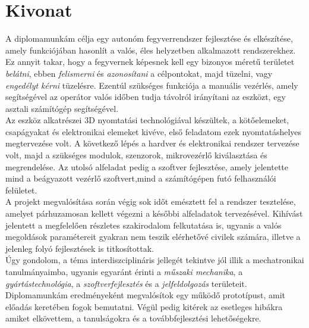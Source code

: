 \setcounter{page}{1}

\selecthungarian

\chapter*{Kivonat}

A diplomamunkám célja egy autonóm fegyverrendszer fejlesztése és elkészítése, amely funkciójában hasonlít a valós, éles helyzetben alkalmazott rendszerekhez. Ez annyit takar, hogy a fegyvernek képesnek kell egy bizonyos méretű területet \textsl{belátni}, ebben \textsl{felismerni} és \textsl{azonosítani} a célpontokat, majd tüzelni, vagy \textsl{engedélyt kérni} tüzelésre. Ezentúl szükséges funkciója a manuális vezérlés, amely segítségével az operátor valós időben tudja távolról irányítani az eszközt, egy asztali számítógép segítségével.\\

Az eszköz alkatrészei 3D nyomtatási technológiával készültek, a kötőelemeket, csapágyakat és elektronikai elemeket kivéve, első feladatom ezek nyomtatáshelyes megtervezése volt. A következő lépés a hardver és elektronikai rendszer tervezése volt, majd a szükséges modulok, szenzorok, mikrovezérlő kiválasztása és megrendelése. Az utolsó alfeladat pedig a szoftver fejlesztése, amely jelentette mind a beágyazott vezérlő szoftvert,mind a számítógépen futó felhasználói felületet.\\

A projekt megvalósítása során végig sok időt emésztett fel a rendszer tesztelése, amelyet párhuzamosan kellett végezni a későbbi alfeladatok tervezésével. Kihívást jelentett a megfelelően részletes szakirodalom felkutatása is, ugyanis a valós megoldások paramétereit gyakran nem teszik elérhetővé civilek számára, illetve a jelenleg folyó fejlesztések is titkosítottak.\\

Úgy gondolom, a téma interdiszciplináris jellegét tekintve jól illik a mechatronikai tanulmányaimba, ugyanis egyaránt érinti a \textsl{műszaki mechanika},  a \textsl{gyártástechnológia}, a \textsl{szoftverfejlesztés} és a \textsl{jelfeldolgozás} területeit.\\

Diplomamunkám eredményeként megvalósítok egy működő prototípust, amit előadás keretében fogok bemutatni. Végül pedig kitérek az esetleges hibákra amiket elkövettem, a tanulságokra és a továbbfejlesztési lehetőségekre.\\

